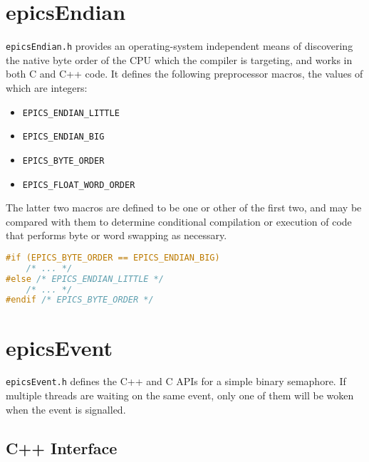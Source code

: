\section{epicsEndian}

\verb|epicsEndian.h| provides an operating-system independent means of discovering the native byte order of the CPU which the compiler is targeting, and works in both C and C++ code.
It defines the following preprocessor macros, the values of which are integers:

\begin{itemize}
\item \verb|EPICS_ENDIAN_LITTLE|
\item \verb|EPICS_ENDIAN_BIG|
\item \verb|EPICS_BYTE_ORDER|
\item \verb|EPICS_FLOAT_WORD_ORDER|
\end{itemize}

The latter two macros are defined to be one or other of the first two, and may be compared with them to determine conditional compilation or execution of code that performs byte or word swapping as necessary.

\begin{lstlisting}[language=C]
#if (EPICS_BYTE_ORDER == EPICS_ENDIAN_BIG)
    /* ... */
#else /* EPICS_ENDIAN_LITTLE */
    /* ... */
#endif /* EPICS_BYTE_ORDER */
\end{lstlisting}

\section{epicsEvent}

\verb|epicsEvent.h| defines the C++ and C APIs for a simple binary semaphore.
If multiple threads are waiting on the same event, only one of them will be woken when the event is signalled.

\subsection{C++ Interface}

